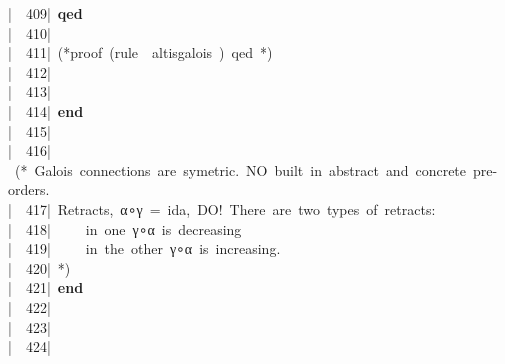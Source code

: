 \documentclass{article}
\newcommand{\syntaxCOMMENTA}[1]{\textcolor[rgb]{0.8,0.0,0.0}{#1}}
\newcommand{\syntaxKEYWORDA}[1]{\textcolor[rgb]{0.0,0.4,0.6}{\textbf{#1}}}
\newcommand{\syntaxKEYWORDB}[1]{\textcolor[rgb]{0.0,0.6,0.4}{\textbf{#1}}}
\newcommand{\syntaxCOMMENTA}[1]{\textcolor[rgb]{0.8,0.0,0.0}{#1}}
\newcommand{\syntaxKEYWORDA}[1]{\textcolor[rgb]{0.0,0.4,0.6}{\textbf{#1}}}
\newcommand{\syntaxKEYWORDB}[1]{\textcolor[rgb]{0.0,0.6,0.4}{\textbf{#1}}}
\newcommand{\syntaxCOMMENTA}[1]{\textcolor[rgb]{0.8,0.0,0.0}{#1}}
\newcommand{\syntaxKEYWORDA}[1]{\textcolor[rgb]{0.0,0.4,0.6}{\textbf{#1}}}
\newcommand{\syntaxKEYWORDB}[1]{\textcolor[rgb]{0.0,0.6,0.4}{\textbf{#1}}}
\newcommand{\syntaxCOMMENTA}[1]{\textcolor[rgb]{0.8,0.0,0.0}{\textbf{#1}}}
\newcommand{\syntaxKEYWORDA}[1]{\textcolor[rgb]{0.0,0.4,0.6}{#1}}
\newcommand{\syntaxKEYWORDB}[1]{\textcolor[rgb]{0.0,0.6,0.4}{#1}}
\newcommand{\syntaxCOMMENTA}[1]{\textcolor[rgb]{0.8,0.0,0.0}{#1}}
\newcommand{\syntaxKEYWORDA}[1]{\textcolor[rgb]{0.0,0.4,0.6}{\textbf{#1}}}
\newcommand{\syntaxKEYWORDB}[1]{\textcolor[rgb]{0.0,0.6,0.4}{\textbf{#1}}}
\newcommand{\syntaxCOMMENTA}[1]{\textcolor[rgb]{0.8,0.0,0.0}{#1}}
\newcommand{\syntaxKEYWORDA}[1]{\textcolor[rgb]{0.0,0.4,0.6}{\textbf{#1}}}
\newcommand{\syntaxKEYWORDB}[1]{\textcolor[rgb]{0.0,0.6,0.4}{\textbf{#1}}}
\newcommand{\syntaxCOMMENTA}[1]{\textcolor[rgb]{0.0,0.0,0.0}{#1}}
\newcommand{\syntaxKEYWORDA}[1]{\textcolor[rgb]{0.0,0.0,0.0}{#1}}
\newcommand{\syntaxKEYWORDB}[1]{\textcolor[rgb]{0.0,0.0,0.0}{#1}}
\newcommand{\gutter}[1]{\textcolor[rgb]{0,0,0}{{|}#1}}
\newcommand{\gutterH}[1]{\textcolor[rgb]{1,0,0}{{|}#1}}
\begin{document}
\gutter{\ \ 409{|}\ }\syntaxKEYWORDA{qed}\hspace*{\fill}\\
\gutterH{\ \ 410{|}\ }\hspace*{\fill}\\
\gutter{\ \ 411{|}\ }\syntaxCOMMENTA{(*proof{\ }(rule{\ }{\ }alt\usebox{\underscorebox}is\usebox{\underscorebox}galois{\ }){\ }qed{\ }*)}\hspace*{\fill}\\
\gutter{\ \ 412{|}\ }{\ }{\ }{\ }{\ }{\ }{\ }{\ }{\ }{\ }{\ }{\ }{\ }{\ }{\ }{\ }{\ }{\ }{\ }{\ }{\ }{\ }{\ }{\ }{\ }{\ }{\ }{\ }\hspace*{\fill}\\
\gutter{\ \ 413{|}\ }\hspace*{\fill}\\
\gutter{\ \ 414{|}\ }\syntaxKEYWORDB{end}\hspace*{\fill}\\
\gutterH{\ \ 415{|}\ }\hspace*{\fill}\\
\gutter{\ \ 416{|}\ }\syntaxCOMMENTA{(*{\ }Galois{\ }connections{\ }are{\ }symetric.{\ }NO{\ }built{\ }in{\ }abstract{\ }and{\ }concrete{\ }pre{-}orders.{\ }}\hspace*{\fill}\\
\gutter{\ \ 417{|}\ }\syntaxCOMMENTA{Retracts,{\ }α∘γ{\ }={\ }id\usebox{\underscorebox}a,{\ }DO!{\ }There{\ }are{\ }two{\ }types{\ }of{\ }retracts:}\hspace*{\fill}\\
\gutter{\ \ 418{|}\ }\syntaxCOMMENTA{{\ }{\ }{\ }{\ }in{\ }one{\ }γ∘α{\ }is{\ }decreasing{\ }}\hspace*{\fill}\\
\gutter{\ \ 419{|}\ }\syntaxCOMMENTA{{\ }{\ }{\ }{\ }in{\ }the{\ }other{\ }γ∘α{\ }is{\ }increasing.{\ }{\ }}\hspace*{\fill}\\
\gutterH{\ \ 420{|}\ }\syntaxCOMMENTA{*)}\hspace*{\fill}\\
\gutter{\ \ 421{|}\ }\syntaxKEYWORDB{end}\hspace*{\fill}\\
\gutter{\ \ 422{|}\ }\hspace*{\fill}\\
\gutter{\ \ 423{|}\ }\hspace*{\fill}\\
\gutter{\ \ 424{|}\ }\hspace*{\fill}\\
\mbox{}
\normalfont
\end{document}
